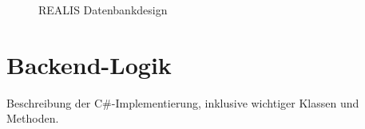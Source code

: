 \begin{figure}[!h]
    \centering
    \caption{REALIS Datenbankdesign}
    \label{fig:realis-datenbankdesign}
\end{figure}
\section{Backend-Logik}
Beschreibung der C\#-Implementierung, inklusive wichtiger Klassen und Methoden.

